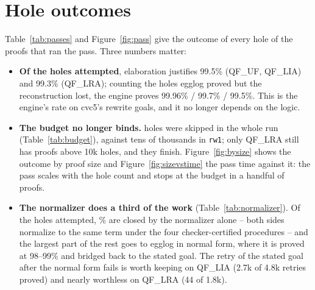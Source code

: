 \documentclass[11pt,a4paper]{article}
\newcommand{\UF}{QF\_UF}
\newcommand{\LIA}{QF\_LIA}
\newcommand{\LRA}{QF\_LRA}
\newcommand{\code}[1]{\texttt{#1}}
\begin{document}
\clearpage
\section{Hole outcomes}\label{sec:passes}

Table~\ref{tab:passes} and Figure~\ref{fig:pass} give the outcome of every
hole of the proofs that ran the pass. Three numbers matter:
\begin{itemize}
  \item \textbf{Of the holes attempted}, elaboration justifies 99.5\%
    (\UF{}, \LIA{}) and 99.3\% (\LRA{}); counting the holes egglog proved
    but the reconstruction lost, the engine proves 99.96\% / 99.7\% /
    99.5\%. This is the engine's rate on cvc5's rewrite goals, and it no
    longer depends on the logic.
  \item \textbf{The budget no longer binds.} \nskipped{} holes were
    skipped in the whole run (Table~\ref{tab:budget}), against tens of
    thousands in \code{rw1}; only \LRA{} still has proofs above 10k holes,
    and they finish. Figure~\ref{fig:bysize} shows the outcome by proof
    size and Figure~\ref{fig:sizevstime} the pass time against it: the
    pass scales with the hole count and stops at the budget in a handful
    of proofs.
  \item \textbf{The normalizer does a third of the work}
    (Table~\ref{tab:normalizer}). Of the holes attempted, \normshare\%
    are closed by the normalizer alone -- both sides normalize to the same
    term under the four checker-certified procedures -- and the largest
    part of the rest goes to egglog in normal form, where it is proved at
    98--99\% and bridged back to the stated goal. The retry of the stated
    goal after the normal form fails is worth keeping on \LIA{} (2.7k of
    4.8k retries proved) and nearly worthless on \LRA{} (44 of 1.8k).
\end{itemize}

\begin{table}[htbp]\centering\footnotesize
\resizebox{\textwidth}{!}{}
\caption{Hole outcomes of the pass, over the proofs that ran it.
  ``attempted'' = justified + kept; ``skipped'' = never tried because the
  budget ran out. ``proved, lost after egglog'' are the kept holes whose
  goal egglog had proved (no certificate, checker rejected, decode
  failure, or killed in the search or the serialization); the last column
  adds them to the justified ones.}\label{tab:passes}
\end{table}
\end{document}
